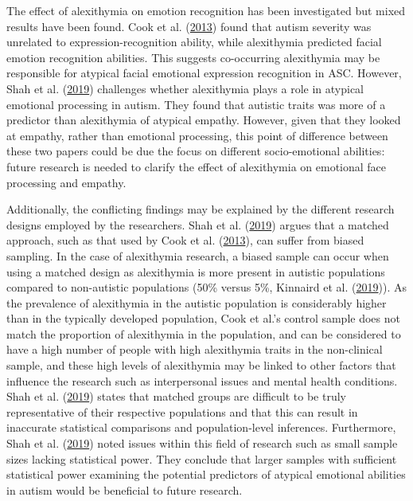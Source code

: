 \documentclass[
]{article}
\begin{document}
The effect of alexithymia on emotion recognition has been investigated but mixed results have been found. Cook et al. (\protect\hyperlink{ref-cook2013a}{2013}) found that autism severity was unrelated to expression-recognition ability, while alexithymia predicted facial emotion recognition abilities. This suggests co-occurring alexithymia may be responsible for atypical facial emotional expression recognition in ASC. However, Shah et al. (\protect\hyperlink{ref-shah2019a}{2019}) challenges whether alexithymia plays a role in atypical emotional processing in autism. They found that autistic traits was more of a predictor than alexithymia of atypical empathy. However, given that they looked at empathy, rather than emotional processing, this point of difference between these two papers could be due the focus on different socio-emotional abilities: future research is needed to clarify the effect of alexithymia on emotional face processing and empathy.

Additionally, the conflicting findings may be explained by the different research designs employed by the researchers. Shah et al. (\protect\hyperlink{ref-shah2019a}{2019}) argues that a matched approach, such as that used by Cook et al. (\protect\hyperlink{ref-cook2013a}{2013}), can suffer from biased sampling. In the case of alexithymia research, a biased sample can occur when using a matched design as alexithymia is more present in autistic populations compared to non-autistic populations (50\% versus 5\%, Kinnaird et al. (\protect\hyperlink{ref-kinnaird2019a}{2019})). As the prevalence of alexithymia in the autistic population is considerably higher than in the typically developed population, Cook et al.'s control sample does not match the proportion of alexithymia in the population, and can be considered to have a high number of people with high alexithymia traits in the non-clinical sample, and these high levels of alexithymia may be linked to other factors that influence the research such as interpersonal issues and mental health conditions. Shah et al. (\protect\hyperlink{ref-shah2019a}{2019}) states that matched groups are difficult to be truly representative of their respective populations and that this can result in inaccurate statistical comparisons and population-level inferences. Furthermore, Shah et al. (\protect\hyperlink{ref-shah2019a}{2019}) noted issues within this field of research such as small sample sizes lacking statistical power. They conclude that larger samples with sufficient statistical power examining the potential predictors of atypical emotional abilities in autism would be beneficial to future research.
\end{document}
